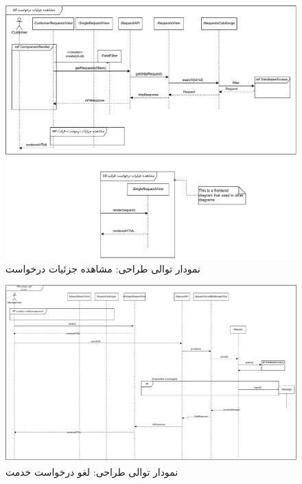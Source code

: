 \begin{figure}[ht!]
	\centering
	\includegraphics[scale=0.8]{figs/design-sequence/3-11.pdf}
	\caption{نمودار توالی طراحی: مشاهده جزئیات درخواست}
\end{figure}
\FloatBarrier
\newpage

\eject \pdfpagewidth=15in \pdfpageheight=12in

\begin{figure}[ht!]
	\centering
	\includegraphics[scale=0.8]{figs/design-sequence/3-16.pdf}
	\caption{نمودار توالی طراحی: لغو درخواست خدمت}
\end{figure}
\FloatBarrier
\newpage


\eject \pdfpagewidth=12in \pdfpageheight=8in

